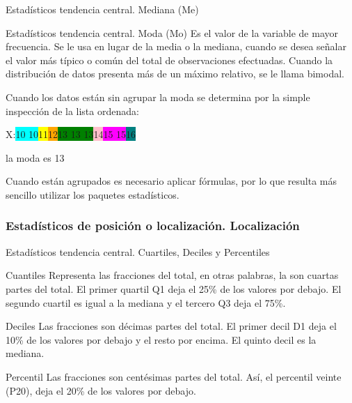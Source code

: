 \documentclass[11pt]{beamer}
\begin{document}
        \begin{frame}{Estadísticos tendencia central. Mediana (Me)}

        \end{frame}

        \begin{frame}{Estadísticos tendencia central. Moda (Mo)}
           Es el valor de la variable de mayor frecuencia. Se le usa en lugar de la media o la mediana, cuando se desea señalar el valor más típico o común del total de observaciones efectuadas. Cuando la distribución de datos presenta más de un máximo relativo, se le llama bimodal.


           Cuando los datos están sin agrupar la moda se determina por la simple inspección de la lista ordenada:

          \begin{center}
            X:\colorbox{cyan}{10 10}\colorbox{yellow}{11}\colorbox{orange}{12}\colorbox{green}{13 13 13}\colorbox{pink}{14}\colorbox{magenta}{15 15}\colorbox{teal}{16}
            \pause

            la moda es  13
          \end{center}

           Cuando están agrupados es necesario aplicar fórmulas, por lo que resulta más sencillo utilizar los paquetes estadísticos.
        \end{frame}


      \subsubsection*{Estadísticos de posición o localización. Localización}

        \begin{frame}{Estadísticos tendencia central. Cuartiles, Deciles y Percentiles }

          \begin{block}{Cuantiles}
             Representa las fracciones del total, en otras palabras, la son cuartas partes del total. El primer quartil Q1 deja el 25\% de los valores por debajo. El segundo cuartil es igual a la mediana y el tercero Q3 deja el 75\%.
          \end{block}

          \pause

          \begin{block}{Deciles}
            Las fracciones son décimas partes del total. El primer decil D1 deja el 10\% de los valores por debajo y el resto por encima. El quinto decil es la mediana.
          \end{block}

          \pause

          \begin{block}{Percentil}
            Las fracciones son centésimas partes del total. Así, el percentil veinte (P20), deja el 20\% de los valores por debajo.
          \end{block}
        \end{frame}
\end{document}
